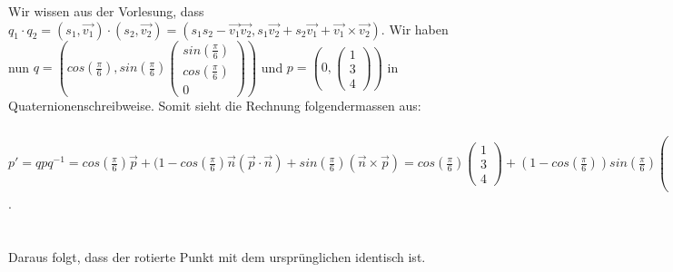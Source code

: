 \documentclass{article} %
\begin{document}
Wir wissen aus der Vorlesung, dass $q_1 \cdot q_2 = (s_1, \vec{v_1}) \cdot (s_2, \vec{v_2}) = (s_1 s_2 - \vec{v_1} \vec{v_2}, s_1 \vec{v_2} + s_2 \vec{v_1} + \vec{v_1} \times \vec{v_2})$. Wir haben nun $q = (cos(\frac{\pi}{6}), sin(\frac{\pi}{6})\begin{pmatrix}
sin(\frac{\pi}{6})\\
cos(\frac{\pi}{6})\\
0
\end{pmatrix})$ und $p = (0, \begin{pmatrix}
1\\
3\\
4
\end{pmatrix})$ in Quaternionenschreibweise. Somit sieht die Rechnung folgendermassen aus: \\\\
$p' = qpq^{-1} = cos(\frac{\pi}{6})\vec{p} + (1 - cos(\frac{\pi}{6})\vec{n}(\vec{p} \cdot \vec{n}) + sin(\frac{\pi}{6}) (\vec{n} \times \vec{p}) = cos(\frac{\pi}{6}) \begin{pmatrix}
1\\
3\\
4
\end{pmatrix} + (1 - cos(\frac{\pi}{6})) sin(\frac{\pi}{6}) \begin{pmatrix}
sin(\frac{\pi}{6})\\
cos(\frac{\pi}{6})\\
0
\end{pmatrix} \cdot \begin{pmatrix}
sin^2(\frac{\pi}{6})\\
3sin(\frac{\pi}{6})cos(\frac{\pi}{6})\\
0
\end{pmatrix} + sin(\frac{\pi}{6}) \begin{pmatrix}
4sin(\frac{\pi}{6})cos(\frac{\pi}{6})\\
-4sin^2(\frac{\pi}{6})\\
3 sin(\frac{\pi}{6}) - cos(\frac{\pi}{6})
\end{pmatrix} = \dotso = \begin{pmatrix}
1\\
3\\
4
\end{pmatrix}$. \\\\\\
Daraus folgt, dass der rotierte Punkt mit dem ursprünglichen identisch ist.
\end{document}
